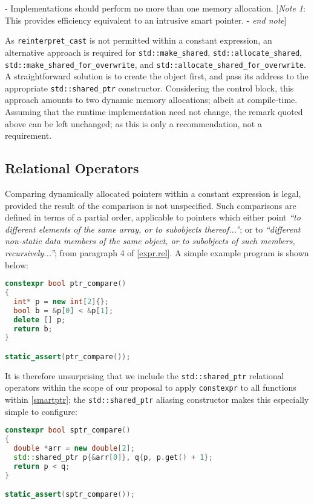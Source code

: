 \documentclass[10pt]{article}
\newcommand*{\wgxxi}[1]{[\href{https://wg21.link/#1}{#1}]}
\begin{document}
 - Implementations should perform no more than one memory allocation.\newline
\makebox[0pt][r]{\quad} \phantom{-} [\emph{Note 1}: This provides efficiency equivalent to an intrusive smart pointer.  - \emph{end note}]

As \texttt{reinterpret\_cast} is not permitted within a constant expression, an
alternative approach is required for \texttt{std::make\_shared},
\texttt{std::allocate\_shared}, \texttt{std::make\_shared\_for\_overwrite},
and \linebreak \texttt{std::allocate\_shared\_for\_overwrite}.  A
straightforward solution is to create the object first, and pass its address to
the appropriate \texttt{std::shared\_ptr} constructor. Considering the control
block, this approach amounts to two dynamic memory allocations; albeit at
compile-time. Assuming that the runtime implementation need not change, the
remark quoted above can be left unchanged; as this is only a recommendation,
not a requirement.

\subsection{Relational Operators}

Comparing dynamically allocated pointers within a constant expression is legal,
provided the result of the comparison is not unspecified.  Such comparisons are
defined in terms of a partial order, applicable to pointers which either point
\emph{``to different elements of the same array, or to subobjects
thereof...''}; or to \emph{``different non-static data members of the same
object, or to subobjects of such members, recursively...''}; from paragraph 4
of \wgxxi{expr.rel}. A simple example program is shown below:

\begin{lstlisting}[language=cpp]
constexpr bool ptr_compare()
{
  int* p = new int[2]{};
  bool b = &p[0] < &p[1];
  delete [] p;
  return b;
}

static_assert(ptr_compare());
\end{lstlisting}

It is therefore unsurprising that we include the \texttt{std::shared\_ptr}
relational operators within the scope of our proposal to apply
\texttt{constexpr} to all functions within \wgxxi{smartptr}; the
\texttt{std::shared\_ptr} aliasing constructor makes this especially simple to
configure:

\begin{lstlisting}[language=cpp]
constexpr bool sptr_compare()
{
  double *arr = new double[2];
  std::shared_ptr p{&arr[0]}, q{p, p.get() + 1};
  return p < q;
}

static_assert(sptr_compare());
\end{lstlisting}
\end{document}

